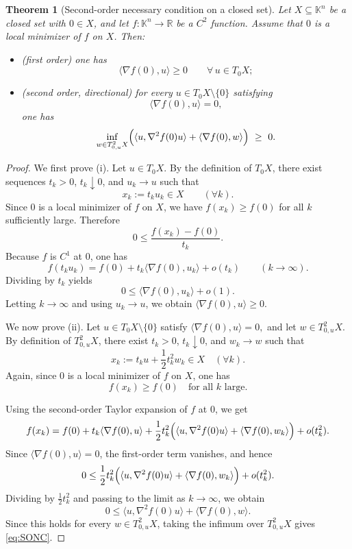 \documentclass[10pt,reqno]{amsart}
\theoremstyle{break-italic}
\theoremstyle{break-italic}
\theoremstyle{break-italic}
\theoremstyle{break-italic}
\theoremstyle{break-italic}
\theoremstyle{break-italic}
\theoremstyle{break-italic}
\theoremstyle{break-italic}
\newtheorem{theorem}[satz]{Theorem}
\theoremstyle{break-roman}
\theoremstyle{standard}
\theoremstyle{varthm-roman}
\theoremstyle{varthm-italic}
\theoremstyle{varthm-roman-break}
\theoremstyle{varthm-italic-break}
\theoremstyle{varthm-roman-no-punctuation}
\theoremstyle{varthm-italic-no-punctuation}
\numberwithin{equation}{section}
\begin{document}
\begin{theorem}[Second-order necessary condition on a closed set]
\label{thm:SONC}
Let $X\subseteq\mathbb K^n$ be a closed set with $0\in X$, and let
$f:\mathbb K^n\to\mathbb R$ be a $C^2$ function. Assume that $0$ is a local
minimizer of $f$ on $X$. Then:
\begin{itemize}
\item[(i)] \emph{(first order)} one has
\[
\langle \nabla f(0),u\rangle \ge 0
\qquad \forall\,u\in T_0X;
\]

\item[(ii)] \emph{(second order, directional)} for every
$u\in T_0X\setminus\{0\}$ satisfying
\[
\langle \nabla f(0),u\rangle=0,
\]
one has
\begin{equation}\label{eq:SONC}
\inf_{w\in T^2_{0,u}X}
\Bigl(
\langle u,\nabla^2 f(0)u\rangle
+
\langle \nabla f(0),w\rangle
\Bigr)\ \ge\ 0 .
\end{equation}
\end{itemize}
\end{theorem}

\begin{proof}
We first prove {\rm(i)}. Let $u\in T_0X$. By the definition of $T_0X$, there exist sequences $t_k>0$, $t_k\downarrow 0$, and
$u_k\to u$ such that
\[
x_k:=t_k u_k\in X
\qquad (\forall k).
\]
Since $0$ is a local minimizer of $f$ on $X$, we have $f(x_k)\ge f(0)$ for all
$k$ sufficiently large. Therefore
\[
0\le \frac{f(x_k)-f(0)}{t_k}.
\]
Because $f$ is $C^1$ at $0$, one has
\[
f(t_k u_k)=f(0)+t_k\langle \nabla f(0),u_k\rangle +o(t_k)
\qquad (k\to\infty).
\]
Dividing by $t_k$ yields
\[
0\le \langle \nabla f(0),u_k\rangle +o(1).
\]
Letting $k\to\infty$ and using $u_k\to u$, we obtain
\(
\langle \nabla f(0),u\rangle \ge 0.
\)

We now prove {\rm(ii)}. Let $u\in T_0X\setminus\{0\}$ satisfy
\(
\langle \nabla f(0),u\rangle =0,
\)
and let $w\in T^2_{0,u}X$. By definition of $T^2_{0,u}X$, there exist
$t_k>0$, $t_k\downarrow 0$, and $w_k\to w$ such that
\[
x_k:=t_k u+\frac12 t_k^2 w_k\in X
\quad (\forall k).
\]
Again, since $0$ is a local minimizer of $f$ on $X$, one has
\[
f(x_k)\ge f(0)
\quad \text{for all } k \text{ large}.
\]

Using the second-order Taylor expansion of $f$ at $0$, we get
\[
f(x_k)=f(0)
+t_k\langle \nabla f(0),u\rangle
+\frac12 t_k^2
\Bigl(
\langle u,\nabla^2 f(0)u\rangle
+
\langle \nabla f(0),w_k\rangle
\Bigr)
+o(t_k^2).
\]
Since $\langle \nabla f(0),u\rangle=0$, the first-order term vanishes, and hence
\[
0\le
\frac12 t_k^2
\Bigl(
\langle u,\nabla^2 f(0)u\rangle
+
\langle \nabla f(0),w_k\rangle
\Bigr)
+o(t_k^2).
\]
Dividing by $\frac12 t_k^2$ and passing to the limit as $k\to\infty$, we obtain
\[
0\le
\langle u,\nabla^2 f(0)u\rangle
+
\langle \nabla f(0),w\rangle.
\]
Since this holds for every $w\in T^2_{0,u}X$, taking the infimum over
$T^2_{0,u}X$ gives \eqref{eq:SONC}.
\end{proof}
\end{document}
